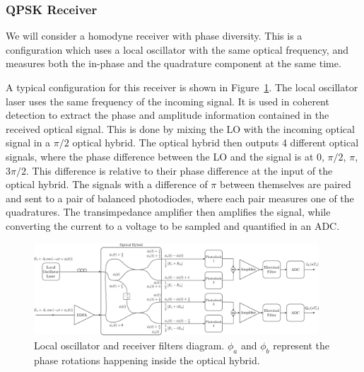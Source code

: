 %


	\subsubsection{QPSK Receiver}\label{sec:teorRX}
	We will consider a homodyne receiver with phase diversity. This is a
	configuration which uses a local oscillator with the same optical frequency,
	and measures both the in-phase and the quadrature component at the same time.

	A typical configuration for this receiver is shown in
	Figure~\ref{fig:rxDiagram}. The local oscillator laser uses the same frequency
	of the incoming signal. It is used in coherent
	detection to extract the phase and amplitude information contained in the received optical
	signal. This is done by mixing the LO with the incoming optical signal in a
	${\pi}/{2}$ optical hybrid. The optical hybrid then outputs 4 different
	optical signals, where the phase difference between the LO and the signal is
	at $0$, ${\pi}/{2}$, ${\pi}$, ${3\pi}/{2}$. This difference is relative to
	their phase difference at the input of the optical hybrid. The signals with a
	difference of $\pi$ between themselves are paired and sent to a pair of
	balanced photodiodes, where each pair measures one of the quadratures. The
	transimpedance amplifier then amplifies the signal, while converting the
	current to a voltage to be sampled and quantified in an ADC.



	\begin{figure}[H]
		\centering
		\centering
		\includegraphics[width=0.95\textwidth]{./sdf/m_qam_system/figures/rxDiagramTeor_edfa.pdf}
		\caption{\label{fig:rxDiagram} Local oscillator and receiver filters
		diagram. $\phi_a$ and $\phi_b$ represent the phase rotations happening
	inside the optical hybrid.}
	\end{figure}


